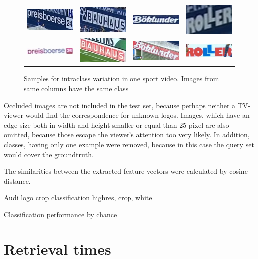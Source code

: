 \begin{figure}
  \centering
    \begin{tabular}{cccc}
      \includegraphics[width=25mm]{images/mt/largevar_1_b.jpg} &   \includegraphics[width=25mm]{images/mt/largevar_2_a.jpg}  & \includegraphics[width=25mm]{images/mt/largevar_3_a.jpg} &   \includegraphics[width=25mm]{images/mt/largevar_4_a.jpg} \\
      \includegraphics[width=25mm]{images/mt/largevar_1_a.jpg} &   \includegraphics[width=25mm]{images/mt/largevar_2_b.jpg}  & \includegraphics[width=25mm]{images/mt/largevar_3_b.jpg} &   \includegraphics[width=25mm]{images/mt/largevar_4_b.jpg}
    \end{tabular}
  \caption{Samples for intraclass variation in one sport video. Images from same columns have the same class.}
  \label{f:largevar}
\end{figure}
Occluded images are not included in the test set, because perhaps neither a TV-viewer would find the correspondence for unknown logos. Images, which have an edge size both in width and height smaller or equal than 25 pixel are also omitted, because those escape the viewer's attention too very likely. In addition, classes, having only one example were removed, because in this case the query set would cover the groundtruth.

The similarities between the extracted feature vectors were calculated by cosine distance. 

Audi logo crop classification highres, crop, white



Classification performance by chance

\section{Retrieval times}